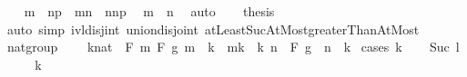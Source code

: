 \begin{isabellebody}
\ \ \isamarkupfalse%
\ {\isachardoublequoteopen}{\isacharbraceleft}{\kern0pt}m\ {\isachardot}{\kern0pt}{\isachardot}{\kern0pt}\ n{\isacharplus}{\kern0pt}p{\isacharbraceright}{\kern0pt}\ {\isacharequal}{\kern0pt}\ {\isacharbraceleft}{\kern0pt}m{\isachardot}{\kern0pt}{\isachardot}{\kern0pt}n{\isacharbraceright}{\kern0pt}\ {\isasymunion}\ {\isacharbraceleft}{\kern0pt}n{\isacharplus}{\kern0pt}{}{\isachardot}{\kern0pt}{\isachardot}{\kern0pt}n{\isacharplus}{\kern0pt}p{\isacharbraceright}{\kern0pt}{\isachardoublequoteclose}\ \isamarkupfalse%
\ {\isacartoucheopen}m\ {\isasymle}\ n{\isacharplus}{\kern0pt}{}{\isacartoucheclose}\ \isamarkupfalse%
\ auto\isanewline
\ \ \isamarkupfalse%
\ {\isacharquery}{\kern0pt}thesis\ \isamarkupfalse%
\ {\isacharparenleft}{\kern0pt}auto\ simp{\isacharcolon}{\kern0pt}\ ivl{\isacharunderscore}{\kern0pt}disj{\isacharunderscore}{\kern0pt}int\ union{\isacharunderscore}{\kern0pt}disjoint\ atLeastSucAtMost{\isacharunderscore}{\kern0pt}greaterThanAtMost{\isacharparenright}{\kern0pt}\isanewline
{}\isamarkupfalse%
%
\endisatagproof
{\isafoldproof}%
%
\isadelimproof
\isanewline
%
\endisadelimproof
\isanewline
{}\isamarkupfalse%
\ nat{\isacharunderscore}{\kern0pt}group{\isacharcolon}{\kern0pt}\ \isanewline
\ \ \ k{\isacharcolon}{\kern0pt}{\isacharcolon}{\kern0pt}nat\ \ {\isachardoublequoteopen}F\ {\isacharparenleft}{\kern0pt}{\isasymlambda}m{\isachardot}{\kern0pt}\ F\ g\ {\isacharbraceleft}{\kern0pt}m\ {\isacharasterisk}{\kern0pt}\ k\ {\isachardot}{\kern0pt}{\isachardot}{\kern0pt}{\isacharless}{\kern0pt}\ m{\isacharasterisk}{\kern0pt}k\ {\isacharplus}{\kern0pt}\ k{\isacharbraceright}{\kern0pt}{\isacharparenright}{\kern0pt}\ {\isacharbraceleft}{\kern0pt}{\isachardot}{\kern0pt}{\isachardot}{\kern0pt}{\isacharless}{\kern0pt}n{\isacharbraceright}{\kern0pt}\ {\isacharequal}{\kern0pt}\ F\ g\ {\isacharbraceleft}{\kern0pt}{\isachardot}{\kern0pt}{\isachardot}{\kern0pt}{\isacharless}{\kern0pt}\ n\ {\isacharasterisk}{\kern0pt}\ k{\isacharbraceright}{\kern0pt}{\isachardoublequoteclose}\isanewline
%
\isadelimproof
%
\endisadelimproof
%
\isatagproof
{}\isamarkupfalse%
\ {\isacharparenleft}{\kern0pt}cases\ k{\isacharparenright}{\kern0pt}\isanewline
\ \ \isamarkupfalse%
\ {\isacharparenleft}{\kern0pt}Suc\ l{\isacharparenright}{\kern0pt}\isanewline
\ \ \isamarkupfalse%
\ \isamarkupfalse%
\ {\isachardoublequoteopen}k\ {\isachargreater}{\kern0pt}\ {}{\isachardoublequoteclose}\isanewline

\end{isabellebody}
